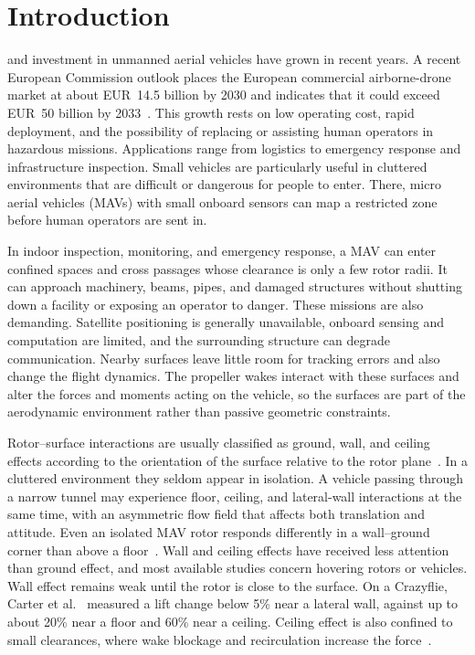 \documentclass[journal]{IEEEtran}
\begin{document}
\IEEEpeerreviewmaketitle

\section{Introduction}
\label{Introduction}
 and investment in unmanned aerial vehicles have grown in recent years. A recent European Commission outlook places the European commercial airborne-drone market at about EUR~14.5 billion by 2030 and indicates that it could exceed EUR~50 billion by 2033~\cite{EuropeanCommission2026}. This growth rests on low operating cost, rapid deployment, and the possibility of replacing or assisting human operators in hazardous missions. Applications range from logistics to emergency response and infrastructure inspection. Small vehicles are particularly useful in cluttered environments that are difficult or dangerous for people to enter. There, micro aerial vehicles (MAVs) with small onboard sensors can map a restricted zone before human operators are sent in.
   
In indoor inspection, monitoring, and emergency response, a MAV can enter confined spaces and cross passages whose clearance is only a few rotor radii. It can approach machinery, beams, pipes, and damaged structures without shutting down a facility or exposing an operator to danger. These missions are also demanding. Satellite positioning is generally unavailable, onboard sensing and computation are limited, and the surrounding structure can degrade communication. Nearby surfaces leave little room for tracking errors and also change the flight dynamics. The propeller wakes interact with these surfaces and alter the forces and moments acting on the vehicle, so the surfaces are part of the aerodynamic environment rather than passive geometric constraints.

Rotor--surface interactions are usually classified as ground, wall, and ceiling effects according to the orientation of the surface relative to the rotor plane~\cite{Matus2020,Carter2021,Franzetti2024}. In a cluttered environment they seldom appear in isolation. A vehicle passing through a narrow tunnel may experience floor, ceiling, and lateral-wall interactions at the same time, with an asymmetric flow field that affects both translation and attitude. Even an isolated MAV rotor responds differently in a wall--ground corner than above a floor~\cite{Prothin2019}. Wall and ceiling effects have received less attention than ground effect, and most available studies concern hovering rotors or vehicles. Wall effect remains weak until the rotor is close to the surface. On a Crazyflie, Carter et al.~\cite{Carter2021} measured a lift change below 5\% near a lateral wall, against up to about 20\% near a floor and 60\% near a ceiling. Ceiling effect is also confined to small clearances, where wake blockage and recirculation increase the force~\cite{Franzetti2024,Cai2024}.
\end{document}
